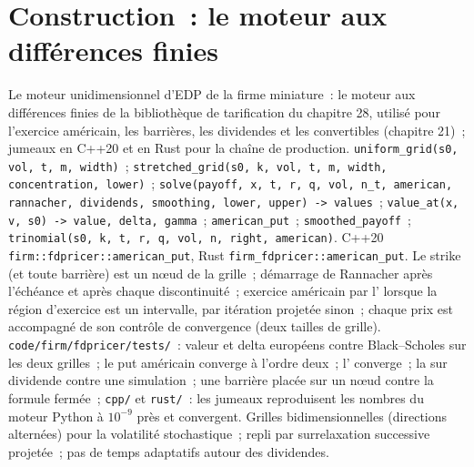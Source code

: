 \section{Construction~: le moteur aux différences finies}\label{bld:dv:trees-and-finite-difference-pricers-in-practice:fdpricer}

\begin{build}
 Le moteur unidimensionnel d'EDP de la firme miniature~: le moteur aux différences finies de la bibliothèque de tarification du chapitre 28, utilisé pour
l'exercice américain, les barrières, les dividendes et les convertibles (chapitre 21)~; jumeaux en C++20 et en Rust pour la chaîne de production.
 \texttt{uniform\_grid(s0, vol, t, m, width)}~; \texttt{stretched\_grid(s0, k, vol, t, m, width, concentration, lower)}~;
\texttt{solve(payoff, x, t, r, q, vol, n\_t, american, rannacher, dividends, smoothing, lower, upper) -> values}~; \texttt{value\_at(x, v, s0) -> value,
delta, gamma}~; \texttt{american\_put}~; \texttt{smoothed\_payoff}~; \texttt{trinomial(s0, k, t, r, q, vol, n, right, american)}. C++20
\texttt{firm::fdpricer::american\_put}, Rust \texttt{firm\_fdpricer::american\_put}.
 Le strike (et toute barrière) est un nœud de la grille~; démarrage de Rannacher après l'échéance et après chaque discontinuité~; exercice américain par
l' lorsque la région d'exercice est un intervalle, par itération projetée sinon~; chaque prix est accompagné de son contrôle de convergence (deux
tailles de grille).
 \texttt{code/firm/fdpricer/tests/}~: valeur et delta européens contre Black--Scholes sur les deux grilles~; le put américain converge à
l'ordre deux~; l' converge~; la  sur dividende contre une simulation~; une barrière placée sur un nœud contre la formule fermée~;
\texttt{cpp/} et \texttt{rust/}~: les jumeaux reproduisent les nombres du moteur Python à $10^{-9}$ près et convergent.
 Grilles bidimensionnelles (directions alternées) pour la volatilité stochastique~; repli par surrelaxation successive projetée~; pas de temps adaptatifs
autour des dividendes.
\end{build}

